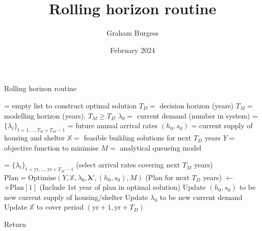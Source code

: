 \documentclass{article}
\title{Rolling horizon routine}
\author{Graham Burgess}
\date{February 2024}
\begin{document}
\maketitle

    \begin{algorithm*}
        
    \caption{Rolling horizon routine}\label{alg:rolling-horizon}
    \begin{algorithmic}[1]
    \State {} = empty list to construct optimal solution
    \State $T_D = $ decision horizon (years)
    \State $T_M = $ modelling horizon (years). $T_M \geq T_D$
    \State $\lambda_{0} =$ current demand (number in system)
    \State \boldsymbol{\lambda} = $\{\lambda_t\}_{t = 1, ..., T_D + T_M - 1}$ = future annual arrival rates
    \State $(h_{0}, s_{0})$ = current supply of housing and shelter
    \State $\mathbb{X} = $ feasible building solutions for next $T_D$ years
    \State $Y = $ objective function to minimise 
    \State $M = $ analytical queueing model

        \State {} = $\{\lambda_t\}_{t = \text{yr}, ..., \text{yr}+T_M-1}$ (select arrival rates covering next $T_M$ years)
        \State $\text{Plan}  = \text{Optimise}(Y, \mathbb{X}, \lambda_{0}, \boldsymbol{\lambda'}, (h_{0}, s_{0}), M)$ (Plan for next $T_D$ years)
        \State {} $\gets $  $+ \text{Plan}[1]$ (Include 1st year of plan in optimal solution)
        \State Update $(h_0,s_0)$ to be new current supply of housing/shelter
        \State Update $\lambda_{0}$ to be new current demand
        \State Update $\mathbb{X}$ to cover period $(\text{yr} + 1, \text{yr} + T_D)$
    \EndFor
    
    \State Return 
    

    
    \end{algorithmic}
    \end{algorithm*}
\end{document}
